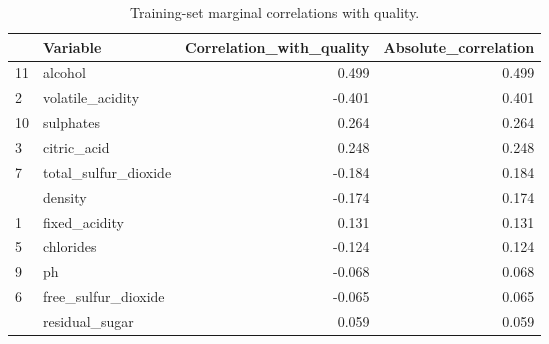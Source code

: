 \begin{table}

\caption{\label{tab:p2-target-correlations}Training-set marginal correlations with quality.}
\centering
\begin{tabular}[t]{llrr}
\toprule
  & Variable & Correlation\_with\_quality & Absolute\_correlation\\
\midrule
11 & alcohol & 0.499 & 0.499\\
2 & volatile\_acidity & -0.401 & 0.401\\
10 & sulphates & 0.264 & 0.264\\
3 & citric\_acid & 0.248 & 0.248\\
7 & total\_sulfur\_dioxide & -0.184 & 0.184\\
\addlinespace
8 & density & -0.174 & 0.174\\
1 & fixed\_acidity & 0.131 & 0.131\\
5 & chlorides & -0.124 & 0.124\\
9 & ph & -0.068 & 0.068\\
6 & free\_sulfur\_dioxide & -0.065 & 0.065\\
\addlinespace
4 & residual\_sugar & 0.059 & 0.059\\
\bottomrule
\end{tabular}
\end{table}
